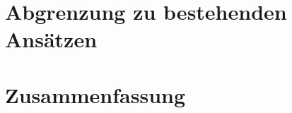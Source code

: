 
\section{Abgrenzung zu bestehenden Ansätzen}
\label{sec:current-approaches-comparison}




\section{Zusammenfassung}
\label{sec:approach-summary}



